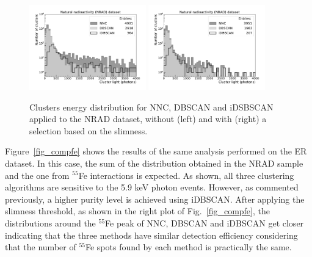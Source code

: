 \documentclass[a4paper,11pt]{article}
\begin{document}
\begin{figure}[ht]
\centering
\includegraphics[width=0.45\textwidth]{LigthYield_Cos_wo.pdf}
\includegraphics[width=0.45\textwidth]{LigthYield_Cos_Slim.pdf}
\caption{Clusters energy distribution for NNC, DBSCAN and iDSBSCAN applied to the NRAD dataset, without (left) and with (right) a selection based on the slimness.}
\label{fig_compcosmic}
\end{figure}

Figure~\ref{fig_compfe} shows the results of the same analysis performed on the ER dataset. In this case, the  sum of the distribution obtained in the NRAD sample and the one from $^{55}$Fe interactions is expected.
As shown, all three clustering algorithms are sensitive to the 5.9 keV photon events. However, as commented previously, a higher purity level is achieved using iDBSCAN.
After applying the slimness threshold, as shown in the right plot of Fig.~\ref{fig_compfe}, the distributions around the $^{55}$Fe peak of NNC, DBSCAN and iDBSCAN get closer indicating that the three methods have similar detection efficiency considering that the number of $^{55}$Fe spots found by each method is practically the same.  
\end{document}
